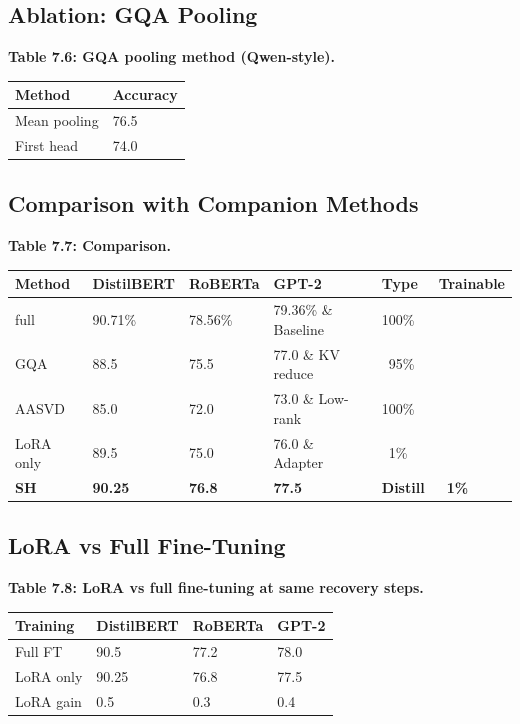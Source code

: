 \subsection{Ablation: GQA Pooling}

\textbf{Table 7.6: GQA pooling method (Qwen-style).}

\begin{table}[H]
\centering
\small
\begin{tabular}{ll}
\toprule
\textbf{Method} & \textbf{Accuracy} \\
\midrule
Mean pooling & 76.5 \\
First head & 74.0 \\
\bottomrule
\end{tabular}
\end{table}

\subsection{Comparison with Companion Methods}

\textbf{Table 7.7: Comparison.}

\begin{table}[H]
\centering
\small
\begin{tabular}{llllll}
\toprule
\textbf{Method} & \textbf{DistilBERT} & \textbf{RoBERTa} & \textbf{GPT-2} & \textbf{Type} & \textbf{Trainable} \\
\midrule
full & 90.71\% & 78.56\% & 79.36\% \& Baseline & 100\% \\
GQA & 88.5 & 75.5 & 77.0 \& KV reduce & ~95\% \\
AASVD & 85.0 & 72.0 & 73.0 \& Low-rank & 100\% \\
LoRA only & 89.5 & 75.0 & 76.0 \& Adapter & ~1\% \\
\textbf{SH} & \textbf{90.25} & \textbf{76.8} & \textbf{77.5} & \textbf{Distill} & \textbf{~1\%} \\
\bottomrule
\end{tabular}
\end{table}

\subsection{LoRA vs Full Fine-Tuning}

\textbf{Table 7.8: LoRA vs full fine-tuning at same recovery steps.}

\begin{table}[H]
\centering
\small
\begin{tabular}{llll}
\toprule
\textbf{Training} & \textbf{DistilBERT} & \textbf{RoBERTa} & \textbf{GPT-2} \\
\midrule
Full FT & 90.5 & 77.2 & 78.0 \\
LoRA only & 90.25 & 76.8 & 77.5 \\
LoRA gain & 0.5 & 0.3 & 0.4 \\
\bottomrule
\end{tabular}
\end{table}

